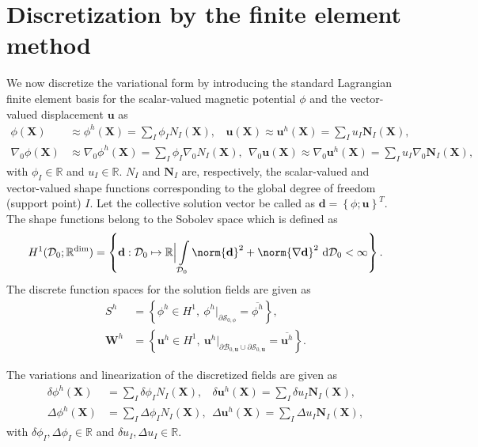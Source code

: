 \documentclass[11pt,a4paper,final]{article}
\begin{document}
\section{Discretization by the finite element method}
We now discretize the variational form  by introducing the standard Lagrangian finite element basis for the scalar-valued magnetic potential $\phi$ and the vector-valued displacement $\mathbf{u}$ as
\begin{align}
\phi (\mathbf{X}) &\approx \phi^h (\mathbf{X}) = \sum\limits_{I} \phi_I N_I (\mathbf{X}), \ \ \ \ \mathbf{u} (\mathbf{X}) \approx \mathbf{u}^h (\mathbf{X}) = \sum\limits_{I} u_I \mathbf{N}_I (\mathbf{X}), \\
\nabla_0 \phi (\mathbf{X}) &\approx \nabla_0 \phi^h (\mathbf{X}) = \sum\limits_{I} \phi_I \nabla_0 N_I (\mathbf{X}), \ \ \nabla_0 \mathbf{u} (\mathbf{X}) \approx \nabla_0 \mathbf{u}^h (\mathbf{X}) = \sum\limits_{I} u_I \nabla_0 \mathbf{N}_I (\mathbf{X}),
\end{align}
with $\phi_I \in \mathbb{R}$ and $u_I \in \mathbb{R}$. $N_I$ and $\mathbf{N}_I$ are, respectively, the scalar-valued and vector-valued shape functions corresponding to the global degree of freedom (support point) $I$. Let the collective solution vector be called as $\mathbf{d} = \left\lbrace \phi; \mathbf{u} \right\rbrace^T$. The shape functions belong to the Sobolev space which is defined as
\begin{equation}
H^1 (\mathcal{D}_0; \mathbb{R}^{\text{dim}}) = \left\lbrace \mathbf{d} : \mathcal{D}_0 \mapsto \mathbb{R} \Big{|} \int\limits_{\mathcal{D}_0} \norm{\mathbf{d}}^2 + \norm{\nabla \mathbf{d}}^2 \ \mathrm{d}\mathcal{D}_0 < \infty \right\rbrace.
\end{equation}
The discrete function spaces for the solution fields are given as
\begin{align}
S^h &= \left\lbrace \phi^h \in H^1, \ \phi^h|_{\partial \mathcal{S}_{0, \phi}} = \overline{\phi^h} \right\rbrace, \\
\mathbf{W}^h &= \left\lbrace \mathbf{u}^h \in H^1, \ \mathbf{u}^h|_{\partial \mathcal{B}_{0, \mathbf{u}} \cup \partial \mathcal{S}_{0, \mathbf{u}}} = \overline{\mathbf{u}^h} \right\rbrace.
\end{align}

\noindent The variations and linearization of the discretized fields are given as
\begin{align}
\delta \phi^h (\mathbf{X}) &= \sum\limits_{I} \delta \phi_I N_I (\mathbf{X}), \ \ \ \ \delta  \mathbf{u}^h (\mathbf{X}) = \sum\limits_{I} \delta u_I \mathbf{N}_I (\mathbf{X}), \\
\Delta \phi^h (\mathbf{X}) &= \sum\limits_{I} \Delta \phi_I N_I (\mathbf{X}), \ \ \Delta \mathbf{u}^h (\mathbf{X}) = \sum\limits_{I} \Delta u_I \mathbf{N}_I (\mathbf{X}),
\end{align}
with $\delta \phi_I, \Delta \phi_I \in \mathbb{R}$ and $\delta u_I, \Delta u_I \in \mathbb{R}$. \par 
\end{document}
